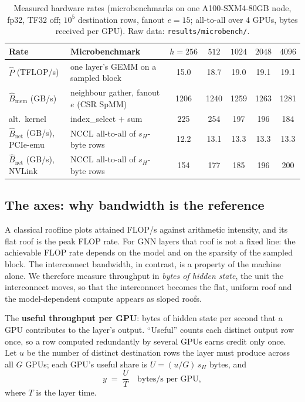 \begin{table}[h]
\centering
\caption{Measured hardware rates (microbenchmarks on one A100-SXM4-80GB node, fp32, TF32 off;
$10^5$ destination rows, fanout $e{=}15$; all-to-all over 4 GPUs, bytes received per GPU).
Raw data: \texttt{results/microbench/}.}
\label{tab:cm-microbench}
\small
\begin{tabular}{l l c c c c c}
\toprule
Rate & Microbenchmark & $h{=}256$ & $512$ & $1024$ & $2048$ & $4096$ \\
\midrule
$\hat{P}$ (TFLOP/s) & one layer's GEMM on a sampled block
  & 15.0 & 18.7 & 19.0 & 19.1 & 19.1 \\
$\hat{B}_{\mathrm{mem}}$ (GB/s) & neighbour gather, fanout $e$ (CSR SpMM)
  & 1206 & 1240 & 1259 & 1263 & 1281 \\
\quad alt.\ kernel & index\_select $+$ sum
  & 225 & 254 & 197 & 196 & 184 \\
$\hat{B}_{\mathrm{net}}$ (GB/s), PCIe-emu & NCCL all-to-all of $s_H$-byte rows
  & 12.2 & 13.1 & 13.3 & 13.3 & 13.3 \\
$\hat{B}_{\mathrm{net}}$ (GB/s), NVLink & NCCL all-to-all of $s_H$-byte rows
  & 154 & 177 & 185 & 196 & 200 \\
\bottomrule
\end{tabular}
\end{table}

\subsection{The axes: why bandwidth is the reference}
\label{sec:cm-axes}

A classical roofline plots attained FLOP/s against arithmetic intensity, and its flat roof is the
peak FLOP rate. For GNN layers that roof is not a fixed line: the achievable FLOP rate depends on
the model and on the sparsity of the sampled block. The interconnect bandwidth, in contrast, is a
property of the machine alone. We therefore measure throughput in \emph{bytes of hidden state},
the unit the interconnect moves, so that the interconnect becomes the flat, uniform roof and the
model-dependent compute appears as sloped roofs.

The \textbf{useful throughput per GPU}: bytes of hidden state per second that a GPU contributes
to the layer's output. ``Useful'' counts each distinct output row once, so a row computed
redundantly by several GPUs earns credit only once. Let $u$ be the number of distinct destination
rows the layer must produce across all $G$ GPUs; each GPU's useful share is
$U = (u/G)\,s_H$ bytes, and
\begin{equation}
  y \;=\; \frac{U}{T} \quad \text{bytes/s per GPU},
  \label{eq:cm-y}
\end{equation}
where $T$ is the layer time.

